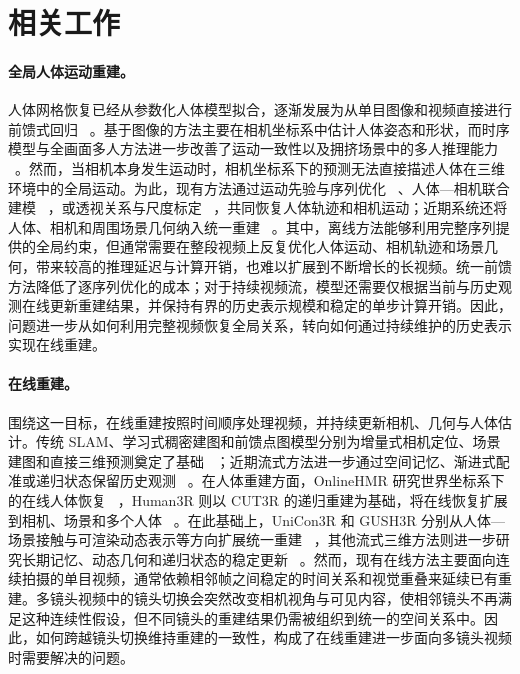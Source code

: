 \section{相关工作}

\paragraph{全局人体运动重建。}
人体网格恢复已经从参数化人体模型拟合，逐渐发展为从单目图像和视频直接进行前馈式回归
~\citep{kanazawa2018hmr,kocabas2020vibe,goel2023humans4d}。基于图像的方法主要在相机坐标系中估计人体姿态和形状，而时序模型与全画面多人方法进一步改善了运动一致性以及拥挤场景中的多人推理能力
~\citep{sun2021romp,sun2022bev,sun2023trace,baradel2024multihmr,wang2025prompthmr,sun2024aios}。然而，当相机本身发生运动时，相机坐标系下的预测无法直接描述人体在三维环境中的全局运动。为此，现有方法通过运动先验与序列优化
~\citep{yuan2022glamr,ye2023slahmr,kocabas2024pace,li2024coin}、人体—相机联合建模
~\citep{wang2024tram,shin2024wham,shen2024gvhmr,yin2024whac}，或透视关系与尺度标定
~\citep{patel2025camerahmr,yang2025checkerboards}，共同恢复人体轨迹和相机运动；近期系统还将人体、相机和周围场景几何纳入统一重建
~\citep{muller2025reconstructing,liu2026josh,zhang2025odhsr,li2026unish,rojas2025hamst3r,yang2026feedforward,liu2026trophies}。其中，离线方法能够利用完整序列提供的全局约束，但通常需要在整段视频上反复优化人体运动、相机轨迹和场景几何，带来较高的推理延迟与计算开销，也难以扩展到不断增长的长视频。统一前馈方法降低了逐序列优化的成本；对于持续视频流，模型还需要仅根据当前与历史观测在线更新重建结果，并保持有界的历史表示规模和稳定的单步计算开销。因此，问题进一步从如何利用完整视频恢复全局关系，转向如何通过持续维护的历史表示实现在线重建。

\paragraph{在线重建。}
围绕这一目标，在线重建按照时间顺序处理视频，并持续更新相机、几何与人体估计。传统 SLAM、学习式稠密建图和前馈点图模型分别为增量式相机定位、场景建图和直接三维预测奠定了基础
~\citep{teed2021droidslam,sun2021neuralrecon,wang2024dust3r,leroy2024mast3r,zhang2025monst3r,wang2025vggt}；近期流式方法进一步通过空间记忆、渐进式配准或递归状态保留历史观测
~\citep{wang2025spann3r,liu2025slam3r,wang2025cut3r}。在人体重建方面，OnlineHMR 研究世界坐标系下的在线人体恢复
~\citep{zhao2026onlinehmr}，Human3R 则以 CUT3R 的递归重建为基础，将在线恢复扩展到相机、场景和多个人体
~\citep{chen2026human3r}。在此基础上，UniCon3R 和 GUSH3R 分别从人体—场景接触与可渲染动态表示等方向扩展统一重建
~\citep{sur2026unicon3r,abe2026gush3r}，其他流式三维方法则进一步研究长期记忆、动态几何和递归状态的稳定更新
~\citep{chen2025long3r,wu2025point3r,zhuo2025st4r,chen2026ttt3r,zheng2026ttsa3r,li2026recal3r}。然而，现有在线方法主要面向连续拍摄的单目视频，通常依赖相邻帧之间稳定的时间关系和视觉重叠来延续已有重建。多镜头视频中的镜头切换会突然改变相机视角与可见内容，使相邻镜头不再满足这种连续性假设，但不同镜头的重建结果仍需被组织到统一的空间关系中。因此，如何跨越镜头切换维持重建的一致性，构成了在线重建进一步面向多镜头视频时需要解决的问题。

